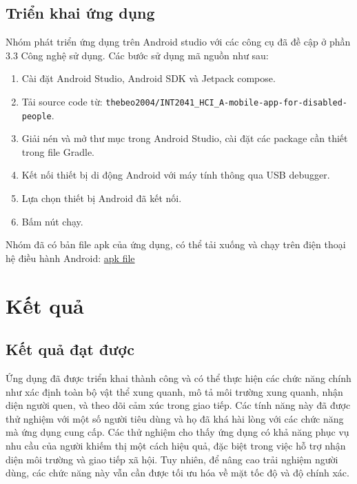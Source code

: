 \documentclass[a4paper,12pt]{article}
\begin{document}
\subsection{Triển khai ứng dụng}
Nhóm phát triển ứng dụng trên Android studio với các công cụ đã đề cập ở phần 3.3 Công nghệ sử dụng. Các bước sử dụng mã nguồn như sau:
\begin{enumerate}
    \item Cài đặt Android Studio, Android SDK và Jetpack compose.
    \item Tải source code từ: \texttt{thebeo2004/INT2041\_HCI\_A-mobile-app-for-disabled-people}.
    \item Giải nén và mở thư mục trong Android Studio, cài đặt các package cần thiết trong file Gradle.
    \item Kết nối thiết bị di động Android với máy tính thông qua USB debugger.
    \item Lựa chọn thiết bị Android đã kết nối.
    \item Bấm nút chạy.
\end{enumerate}

Nhóm đã có bản file apk của ứng dụng, có thể tải xuống và chạy trên điện thoại hệ điều hành Android: \href{https://drive.google.com/file/d/1o4fchQpnmcFAMVoahwLiwrBWShIv1h_4/view?usp=sharing}{apk file}

\section{Kết quả}
\subsection{Kết quả đạt được}

Ứng dụng đã được triển khai thành công và có thể thực hiện các chức năng chính như xác định toàn bộ vật thể xung quanh, mô tả môi trường xung quanh, nhận diện người quen, và theo dõi cảm xúc trong giao tiếp. Các tính năng này đã được thử nghiệm với một số người tiêu dùng và họ đã khá hài lòng với các chức năng mà ứng dụng cung cấp. Các thử nghiệm cho thấy ứng dụng có khả năng phục vụ nhu cầu của người khiếm thị một cách hiệu quả, đặc biệt trong việc hỗ trợ nhận diện môi trường và giao tiếp xã hội. Tuy nhiên, để nâng cao trải nghiệm người dùng, các chức năng này vẫn cần được tối ưu hóa về mặt tốc độ và độ chính xác.
\end{document}
